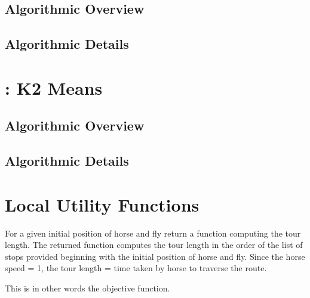 \documentclass[11.5pt]{report}
\begin{document}
\subsection{Algorithmic Overview}
\subsection{Algorithmic Details}
\section{: K2 Means}  

\subsection{Algorithmic Overview}
\subsection{Algorithmic Details}
\section{Local Utility Functions}

\newchunk  For a given initial position of horse and fly
   return a function computing the tour length. 
   The returned function computes the tour length 
   in the order of the list of stops provided beginning 
   with the initial position of horse and fly. Since 
   the horse speed = 1, the tour length = time taken 
   by horse to traverse the route.

   This is in other words the objective function. 
\end{document}
